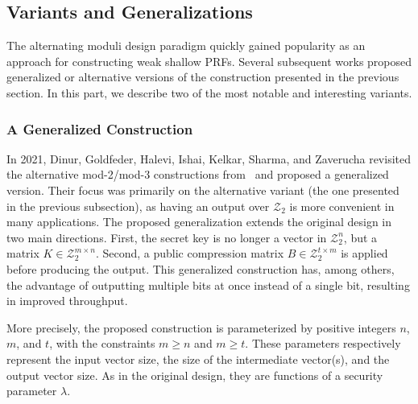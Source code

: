 \documentclass[journal=tosc,submission]{iacrtrans}
\theoremstyle{theorem}
\newcommand\Z{\mathcal{Z}}
\newcommand\gc[1]{\textcolor{olive!80}{\textbf{Geoffroy:} #1}}
\begin{document}
\subsection{Variants and Generalizations}

The alternating moduli design paradigm quickly gained popularity as an approach for constructing weak shallow PRFs. Several subsequent works proposed generalized or alternative versions of the construction presented in the previous section. In this part, we describe two of the most notable and interesting variants.

\subsubsection{A Generalized Construction~\cite{C:DGHIKS21}}
\label{sec:bipsw_alt1}

In 2021, Dinur, Goldfeder, Halevi, Ishai, Kelkar, Sharma, and Zaverucha revisited the alternative mod-2/mod-3 constructions from~\cite{TCC:BIPSW18} and proposed a generalized version. Their focus was primarily on the alternative variant (the one presented in the previous subsection), as having an output over $\Z_2$ is more convenient in many applications. The proposed generalization extends the original design in two main directions. First, the secret key is no longer a vector in $\Z_2^n$, but a matrix $K \in \Z_2^{m \times n}$. Second, a public compression matrix $B \in \Z_2^{t \times m}$ is applied before producing the output. This generalized construction has, among others, the advantage of outputting multiple bits at once instead of a single bit, resulting in improved throughput. 

More precisely, the proposed construction is parameterized by positive integers $n$, $m$, and $t$, with the constraints $m \geq n$ and $m \geq t$. These parameters respectively represent the input vector size, the size of the intermediate vector(s), and the output vector size. As in the original design, they are functions of a security parameter $\lambda$.
\end{document}
